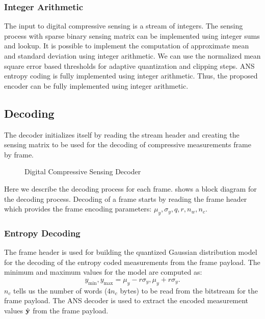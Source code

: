 \subsubsection{Integer Arithmetic}
The input to digital compressive sensing is a stream of integers.
The sensing process with sparse binary sensing matrix can be implemented
using integer sums and lookup.
It is possible to implement the computation of
approximate mean and standard deviation
using integer arithmetic.
We can use the normalized mean square error
based thresholds for adaptive quantization and clipping steps.
ANS entropy coding is fully implemented using integer arithmetic.
Thus, the proposed encoder can be fully implemented using integer arithmetic.

\FloatBarrier

\subsection{Decoding}
The decoder initializes itself by reading the stream
header and creating the sensing matrix to be used
for the decoding of compressive measurements
frame by frame. 

\begin{figure}[!ht]
\centering 

\caption{Digital Compressive Sensing Decoder}
\label{fig:cs:decoder}
\end{figure}

\begin{figure}[!t]
 \removelatexerror
 \centering

\end{figure}
Here we describe the decoding process for each frame.
 shows a block diagram for the
decoding process.
Decoding of a frame starts by reading the frame header
which provides the frame encoding parameters:
$\mu_y, \sigma_y, q, r, n_w, n_c$.
\subsubsection{Entropy Decoding}
The frame header is used for building the quantized
Gaussian distribution model for the decoding of the
entropy coded measurements from the frame payload.
The minimum and maximum values for the model are
computed as:
\begin{equation}
y_{\min}, y_{\max} = \mu_y  - r \sigma_y, \mu_y  + r \sigma_y.
\end{equation}
$n_c$ tells us the number of words ($4 n_c$ bytes) to be
read from the bitstream for the frame payload.
The ANS decoder is used to extract the encoded measurement
values $\hat{\mathbf{y}}$ from the frame payload.
